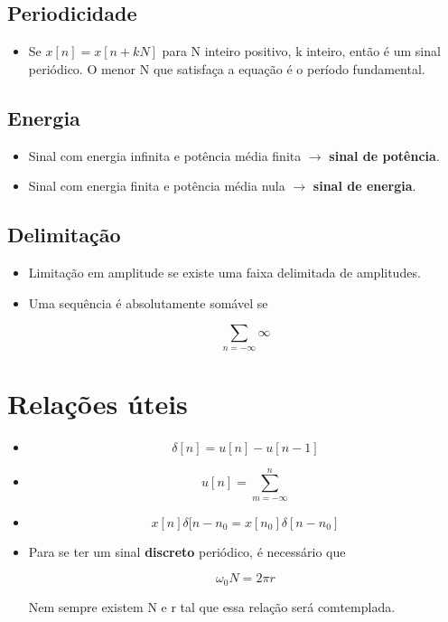 \subsection{Periodicidade}

\begin{itemize}
    \item Se $x[n] = x[n + kN]$ para N inteiro positivo, k inteiro, então é um sinal periódico. O menor N que satisfaça a equação é o período fundamental.
\end{itemize}

\subsection{Energia}

\begin{itemize}
    \item Sinal com energia infinita e potência média finita $\rightarrow$ \textbf{sinal de potência}.
    
    \item Sinal com energia finita e potência média nula $\rightarrow$ \textbf{sinal de energia}.
    
\end{itemize}

\subsection{Delimitação}

\begin{itemize}
    \item Limitação em amplitude se existe uma faixa delimitada de amplitudes.
    \item Uma sequência é absolutamente somável se 
    
    \[\sum_{n = -\infty}{\infty}\]
\end{itemize}

\section{Relações úteis}

\begin{itemize}
    \item \[\delta[n] = u[n] - u[n - 1]\]
    \item \[u[n] = \sum_{m = -\infty}^{n} \]
    \item \[x[n]\delta[n - n_{0} = x[n_{0}]\delta[n - n_{0}]\]
    \item Para se ter um sinal \textbf{discreto} periódico, é necessário que
    
    \[\omega_{0}N = 2\pi r\]

    Nem sempre existem N e r tal que essa relação será comtemplada.

\end{itemize}

